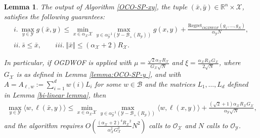 \documentclass[a4paper,12pt]{article}
\newtheorem{lemma} {Lemma}
\newcommand{\mY}{\mathcal{Y}}
\newcommand{\mX}{\mathcal{X}}
\newcommand{\tY}{\tilde{\mathcal{Y}}}
\newcommand{\mB}{\mathcal{B}}
\newcommand{\reals}{\mathbb{R}}
\newcommand{\oraclex}{\mathcal{O}_{\mX}}
\newcommand{\oracley}{\mathcal{O}_{\mY}}
\begin{document}
\begin{lemma}\label{lemma:OCO-SP-xy}
The output of Algorithm \ref{OCO-SP-xy}, the tuple  $(\bar{x}, \bar{y})\in\reals^n\times\mX$, satisfies the following guarantees:
\begin{align*}
&i.~\max_{y \in  \mY} g(\bar{x},y) \leq \min_{x\in \alpha_{\mX}\mX} \max_{y \in \alpha_{\mY}^{-1}(\mY-\mB_+(R_{\mY}))} g(x,y)+ \frac{\text{Regret}_{OGDWOF}(g_1,\dots,g_N)}{\alpha_{\mY} N},   \\
&ii.~ \bar{s}\leq \bar{x}, \qquad iii.~ \Vert{\bar{x}}\Vert \leq (\alpha_{\mX}+2)R_{\mX}.
\end{align*}

In particular, if OGDWOF is applied with $\mu =\frac{\sqrt{2}\alpha_{\mX} R_{\mX}}{G_{\mX}\sqrt{N}}$ and $\xi =\frac{\alpha_{\mX} R_{\mX}G_{\mX}}{2\sqrt{N}}$, where $G_{\mX}$ is as defined in Lemma \ref{lemma:OCO-SP-y }, and with $A = A_{\ell,w} := \sum_{i=1}^dw(i)L_i$ for some $w\in\mB$ and the matrices $L_1,\dots,L_d$ defined in Lemma \ref{bi-linear lemma}, then 
\begin{align}\label{eq:OCO-SP-xy:1}
\max_{y \in \mY} \langle{w,\ell(\bar{x},y)}\rangle \leq \min_{x\in \alpha_{\mX} \mX} \max_{y \in \alpha_{\mY}^{-1}(\mY-\mB_+(R_{\mY}))}\langle{w,\ell(x,y)}\rangle+ \frac{(\sqrt{2}+1)\alpha_{\mX} R_{\mX} G_{\mX}}{\alpha_{\mY} \sqrt{N}},
\end{align}
and the algorithm requires $O \left( \frac{{(\alpha_{\mX} +2)}^4 {R_{\mX}}^2}{\alpha_{\mX}^2  G_{\mX}^2 } N^2\right)$ calls to $\oraclex$ and $N$ calls to $\oracley$.
\end{lemma}
\end{document}
